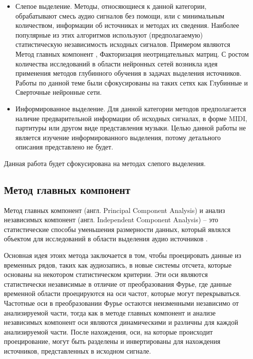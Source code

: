 \begin{itemize}
	\item Слепое выделение. Методы, относяющиеся к данной категории, обрабатывают смесь аудио сигналов без помощи, или с минимальным количеством, информации об источниках и методах их сведения. Наиболее популярные из этих алгоритмов используют (предполагаемую) статистическую независимость исходных сигналов. Примером являются Метод главных компонент \cite{Lopez} \cite{Dadula}, Факторизация неотрицательных матриц. С ростом количества исследований в области нейронных сетей возникла идея применения методов глубинного обучения в задачах выделения источников. Работы по данной теме были сфокусированы на таких сетях как Глубинные и Сверточные нейронные сети.
	\item Информированное выделение. Для данной категории методов предполагается наличие предварительной информации об исходных сигналах, в форме MIDI, партитуры или другом виде представления музыки\cite{Miron}. Целью данной работы не является изучение информированного выделения, потому детального описания представлено не будет.
\end{itemize}

Данная работа будет сфокусирована на методах слепого выделения.

\subsection{Метод главных компонент}
Метод главных компонент (англ. Principal Component Analysis) и анализ независимых компонент (англ. Independent Component Analysis) -- это статистические способы уменьшения размерности данных, который являлся объектом для исследований в области выделения аудио источников \cite{Lopez} \cite{Dadula}.

Основная идея этоих метода заключается в том, чтобы проецировать данные из временных рядов, таких как аудиозапись, в новые системы отсчета, которые основаны на некотором статистическом критерии. Эти оси являются статистически независимые в отличие от преобразования Фурье, где данные временной области проецируются на оси частот, которые могут перекрываться. Частотные оси в преобразовании Фурье остаются неизменными независимо от анализируемой части, тогда как в методе главных компонент и анализе независимых компонент оси являются динамическими и различны для каждой анализируемой части. После нахождения, оси, на которые происходит проецирование, могут быть разделены и инвертированы для нахождения источников, представленных в исходном сигнале.

